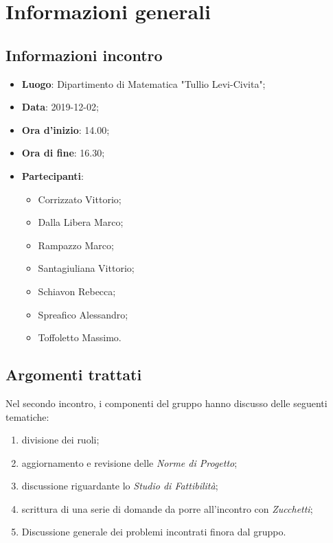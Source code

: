 \section{Informazioni generali}
    \subsection{Informazioni incontro}
        \begin{itemize}
            \item \textbf{Luogo}: Dipartimento di Matematica "Tullio Levi-Civita";
            \item \textbf{Data}: 2019-12-02;
            \item \textbf{Ora d'inizio}: 14.00;
            \item \textbf{Ora di fine}: 16.30;
            \item \textbf{Partecipanti}: \begin{itemize}
                \item Corrizzato Vittorio;
                \item Dalla Libera Marco;
                \item Rampazzo Marco;
                \item Santagiuliana Vittorio;
                \item Schiavon Rebecca;
                \item Spreafico Alessandro;
                \item Toffoletto Massimo.
            \end{itemize}
        \end{itemize}
    \subsection{Argomenti trattati}
        Nel secondo incontro, i componenti del gruppo hanno discusso delle seguenti tematiche:
        \begin{enumerate}
            \item divisione dei ruoli;
            \item aggiornamento e revisione delle \textit{Norme di Progetto};
            \item discussione riguardante lo \textit{Studio di Fattibilità};
            \item scrittura di una serie di domande da porre all'incontro con \textit{Zucchetti};
            \item Discussione generale dei problemi incontrati finora dal gruppo.
        \end{enumerate}
